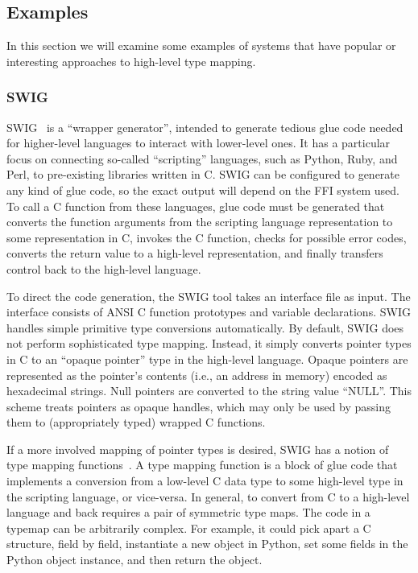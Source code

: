 \subsection{Examples}

In this section we will examine some examples of systems that have popular or interesting approaches to high-level type mapping.

\subsubsection{SWIG}

SWIG~\cite{beazley96swig} is a ``wrapper generator'', intended to generate tedious glue code needed for higher-level languages to interact with lower-level ones. It has a particular focus on connecting so-called ``scripting'' languages, such as Python, Ruby, and Perl, to pre-existing libraries written in C. SWIG can be configured to generate any kind of glue code, so the exact output will depend on the FFI system used. To call a C function from these languages, glue code must be generated that converts the function arguments from the scripting language representation to some representation in C, invokes the C function, checks for possible error codes, converts the return value to a high-level representation, and finally transfers control back to the high-level language.

To direct the code generation, the SWIG tool takes an interface file as input. The interface consists of ANSI C function prototypes and variable declarations. SWIG handles simple primitive type conversions automatically. By default, SWIG does not perform sophisticated type mapping. Instead, it simply converts pointer types in C to an ``opaque pointer'' type in the high-level language. Opaque pointers are represented as the pointer's contents (i.e., an address in memory) encoded as hexadecimal strings. Null pointers are converted to the string value ``NULL''. This scheme treats pointers as opaque handles, which may only be used by passing them to (appropriately typed) wrapped C functions.

If a more involved mapping of pointer types is desired, SWIG has a notion of type mapping functions~\cite{swigtypemaps}. A type mapping function is a block of glue code that implements a conversion from a low-level C data type to some high-level type in the scripting language, or vice-versa. In general, to convert from C to a high-level language and back requires a pair of symmetric type maps. The code in a typemap can be arbitrarily complex. For example, it could pick apart a C structure, field by field, instantiate a new object in Python, set some fields in the Python object instance, and then return the object.

